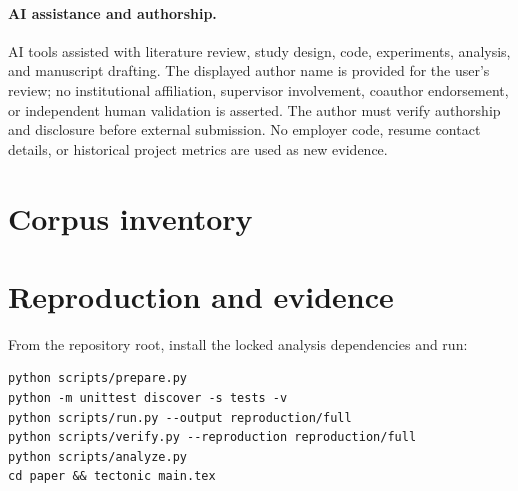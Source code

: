 \documentclass[10pt]{article}
\begin{document}
\paragraph{AI assistance and authorship.}
AI tools assisted with literature review, study design, code, experiments, analysis, and manuscript drafting. The displayed author name is provided for the user's review; no institutional affiliation, supervisor involvement, coauthor endorsement, or independent human validation is asserted. The author must verify authorship and disclosure before external submission. No employer code, resume contact details, or historical project metrics are used as new evidence.



\appendix
\small
\section{Corpus inventory}
\begin{table}[h]
\centering\small
\caption{Candidate counts and gate survivors. Holdout pass counts agreement on all evaluation inputs before gate filtering. Equivalent mutants are intentionally retained.}\label{tab:inventory}
\end{table}

\section{Reproduction and evidence}
From the repository root, install the locked analysis dependencies and run:
\begin{verbatim}
python scripts/prepare.py
python -m unittest discover -s tests -v
python scripts/run.py --output reproduction/full
python scripts/verify.py --reproduction reproduction/full
python scripts/analyze.py
cd paper && tectonic main.tex
\end{verbatim}
\end{document}
